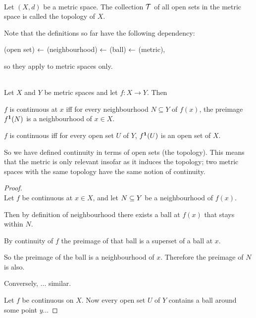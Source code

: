 \begin{definition}~\\
  Let $(X, d)$ be a metric space. The collection $\mathcal T$ of all open sets in the metric space is
  called the topology of $X$.
\end{definition}

\begin{remark*}
  Note that the definitions so far have the following dependency:

  (open set) $\leftarrow$ (neighbourhood) $\leftarrow$ (ball) $\leftarrow$ (metric),

  so they apply to metric spaces only.
\end{remark*}

\begin{theorem}~\\
  Let $X$ and $Y$ be metric spaces and let $f:X \to Y$. Then

  $f$ is continuous at $x$ iff for every neighbourhood $N \subseteq Y$ of $f(x)$, the preimage
  $f^{\mathbf 1}(N)$ is a neighbourhood of $x \in X$.

  $f$ is continuous iff for every open set $U$ of $Y$, $f^{\mathbf 1}(U)$ is an open set of $X$.
\end{theorem}

\begin{remark*}
  So we have defined continuity in terms of open sets (the topology). This means that the metric is
  only relevant insofar as it induces the topology; two metric spaces with the same topology have
  the same notion of continuity.
\end{remark*}

\begin{proof}~\\
  Let $f$ be continuous at $x \in X$, and let $N \subseteq Y$ be a neighbourhood of $f(x)$.

  Then by definition of neighbourhood there exists a ball at $f(x)$ that stays within $N$.

  By continuity of $f$ the preimage of that ball is a superset of a ball at $x$.

  So the preimage of the ball is a neighbourhood of $x$. Therefore the preimage of $N$ is also.

  Conversely, ... similar.

  Let $f$ be continuous on $X$. Now every open set $U$ of $Y$ contains a ball around some point $y$...
\end{proof}

